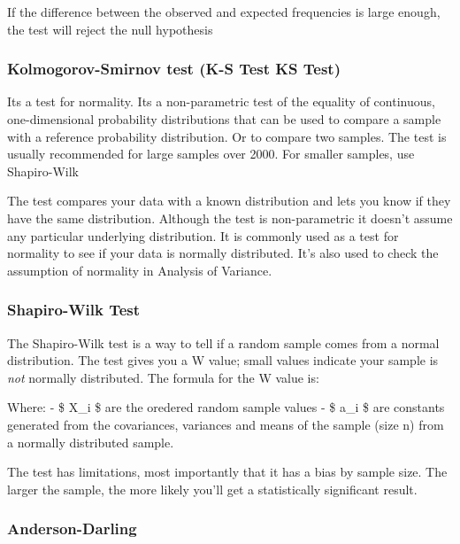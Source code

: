 \documentclass[11pt]{article}
\begin{document}
If the difference between the observed and expected frequencies is large
enough, the test will reject the null hypothesis

\hypertarget{kolmogorov-smirnov-test-k-s-test-ks-test}{%
\subsubsection{Kolmogorov-Smirnov test (K-S Test \textbar{} KS
Test)}\label{kolmogorov-smirnov-test-k-s-test-ks-test}}

Its a test for normality. Its a non-parametric test of the equality of
continuous, one-dimensional probability distributions that can be used
to compare a sample with a reference probability distribution. Or to
compare two samples. The test is usually recommended for large samples
over 2000. For smaller samples, use Shapiro-Wilk

The test compares your data with a known distribution and lets you know
if they have the same distribution. Although the test is non-parametric
it doesn't assume any particular underlying distribution. It is commonly
used as a test for normality to see if your data is normally
distributed. It's also used to check the assumption of normality in
Analysis of Variance.

\hypertarget{shapiro-wilk-test}{%
\subsubsection{Shapiro-Wilk Test}\label{shapiro-wilk-test}}

The Shapiro-Wilk test is a way to tell if a random sample comes from a
normal distribution. The test gives you a W value; small values indicate
your sample is \emph{not} normally distributed. The formula for the W
value is: 


Where: - \$ X\_i \$ are the oredered random sample values - \$ a\_i \$
are constants generated from the covariances, variances and means of the
sample (size n) from a normally distributed sample.

The test has limitations, most importantly that it has a bias by sample
size. The larger the sample, the more likely you'll get a statistically
significant result.

\hypertarget{anderson-darling}{%
\subsubsection{Anderson-Darling}\label{anderson-darling}}
\end{document}
